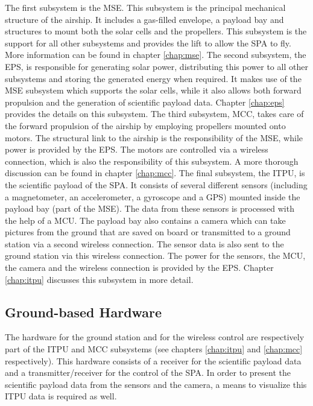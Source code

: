 The first subsystem is the \ac{MSE}. This subsystem is the principal mechanical structure of the airship. It includes a gas-filled envelope, a payload bay and structures to mount both the solar cells and the propellers. This subsystem is the support for all other subsystems and provides the lift to allow the \ac{SPA} to fly. More information can be found in chapter \ref{chap:mse}. The second subsystem, the \ac{EPS}, is responsible for generating solar power, distributing this power to all other subsystems and storing the generated energy when required. It makes use of the \ac{MSE} subsystem which supports the solar cells, while it also allows both forward propulsion and the generation of scientific payload data.  Chapter \ref{chap:eps} provides the details on this subsystem. The third subsystem, \ac{MCC}, takes care of the forward propulsion of the airship by employing propellers mounted onto motors. The structural link to the airship is the responsibility of the \ac{MSE}, while power is provided by the \ac{EPS}. The motors are controlled via a wireless connection, which is also the responsibility of this subsystem. A more thorough discussion can be found in chapter \ref{chap:mcc}. The final subsystem, the \ac{ITPU}, is the scientific payload of the \ac{SPA}. It consists of several different sensors (including a magnetometer, an accelerometer, a gyroscope and a \ac{GPS}) mounted inside the payload bay (part of the \ac{MSE}). The data from these sensors is processed with the help of a \ac{MCU}. The payload bay also contains a camera which can take pictures from the ground that are saved on board or transmitted to a ground station via a second wireless connection. The sensor data is also sent to the ground station via this wireless connection. The power for the sensors, the \ac{MCU}, the camera and the wireless connection is provided by the \ac{EPS}. Chapter \ref{chap:itpu} discusses this subsystem in more detail.

\subsection{Ground-based Hardware}

The hardware for the ground station and for the wireless control are respectively part of the \ac{ITPU} and \ac{MCC} subsystems (see chapters \ref{chap:itpu} and \ref{chap:mcc} respectively).  This hardware consists of a receiver for the scientific payload data and a transmitter/receiver for the control of the \ac{SPA}.  In order to present the scientific payload data from the sensors and the camera, a means to visualize this \ac{ITPU} data is required as well.

